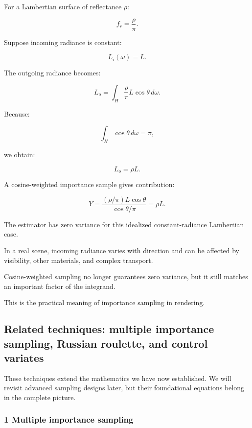 \hypertarget{02-foundations-ii-ch031-lambertian-reflection}{}

For a Lambertian surface of reflectance \(\rho\):

\[
 f_r=\frac\rho\pi.
\]

Suppose incoming radiance is constant:

\[
 L_i(\omega)=L.
\]

The outgoing radiance becomes:

\[
 L_o= \int_H \frac\rho\pi L\cos\theta\,d\omega.
\]

Because:

\[
 \int_H\cos\theta\,d\omega=\pi,
\]

we obtain:

\[
 \boxed{L_o=\rho L}.
\]

A cosine-weighted importance sample gives contribution:

\[
 Y= \frac{ (\rho/\pi)L\cos\theta }{ \cos\theta/\pi } =\rho L.
\]

The estimator has zero variance for this idealized constant-radiance Lambertian case.

In a real scene, incoming radiance varies with direction and can be affected by visibility, other materials, and complex transport.

Cosine-weighted sampling no longer guarantees zero variance, but it still matches an important factor of the integrand.

This is the practical meaning of importance sampling in rendering.

\subsection{Related techniques: multiple importance sampling, Russian roulette, and control variates}\label{02-foundations-ii-ch031-related-techniques-multiple-importance-sampling-russian-roulette-and-control-variates}

\hypertarget{02-foundations-ii-ch031-related-techniques-multiple-importance-sampling-russian-roulette-and-control-variates}{}

These techniques extend the mathematics we have now established. We will revisit advanced sampling designs later, but their foundational equations belong in the complete picture.

\subsubsection{1 Multiple importance sampling}\label{02-foundations-ii-ch031-multiple-importance-sampling}

